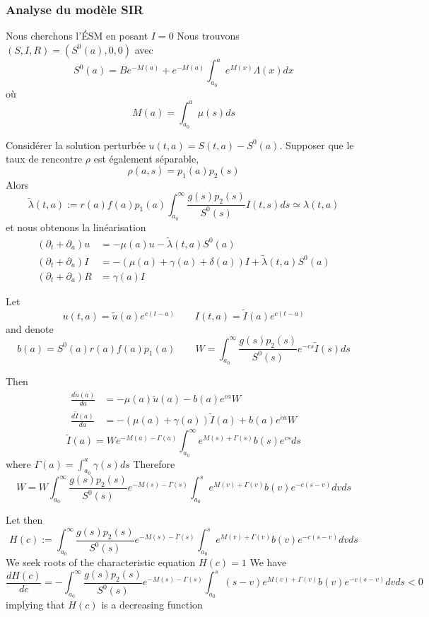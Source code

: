 \documentclass[aspectratio=169]{beamer}\usepackage[]{graphicx}\usepackage[]{xcolor}
\begin{document}
\begin{frame}\frametitle{Analyse du modèle SIR}
Nous cherchons l'ÉSM en posant $I=0$
\vfill
Nous trouvons $(S,I,R)=(S^0(a),0,0)$ avec
\[
S^0(a)=Be^{-M(a)} +e^{-M(a)}\int_{a_0}^a e^{M(x)}\Lambda(x)dx
\]
où
\[
M(a)=\int_{a_0}^a \mu(s)ds
\]
\end{frame}


\begin{frame}
Considérer la solution perturbée $u(t,a)=S(t,a)-S^0(a)$. Supposer que le taux de rencontre $\rho$ est également séparable,
\[
\rho(a,s)=p_1(a)p_2(s)
\]
Alors
\[
\tilde\lambda(t,a):=r(a)f(a)p_1(a)\int_{a_0}^\infty
\frac{g(s)p_2(s)}{S^0(s)}I(t,s) ds \simeq \lambda(t,a)
\]
et nous obtenons la linéarisation
\begin{align*}
(\partial_t+\partial_a)u&=-\mu(a)u-\tilde\lambda(t,a)S^0(a) \\
(\partial_t+\partial_a)I&=-(\mu(a)+\gamma(a)+\delta(a))I
+\tilde\lambda(t,a)S^0(a) \\
(\partial_t+\partial_a)R&=\gamma(a)I
\end{align*}
\end{frame}


\begin{frame}
Let
\[
u(t,a)=\tilde u(a)e^{c(t-a)}\quad\quad I(t,a)=\tilde I(a)e^{c(t-a)}
\]
and denote
\[
b(a)=S^0(a)r(a)f(a)p_1(a)\quad\quad W=\int_{a_0}^\infty
\frac{g(s)p_2(s)}{S^0(s)}e^{-cs}\tilde I(s)ds
\]
\end{frame}


\begin{frame}
Then
\begin{align*}
\frac{d\tilde u(a)}{da} &= -\mu(a)\tilde u(a)-b(a)e^{ca}W \\
\frac{d\tilde I(a)}{da} &= -(\mu(a)+\gamma(a))\tilde I(a)+b(a)e^{ca}W
\end{align*}
\[
\tilde I(a)=We^{-M(a)-\Gamma(a)}\int_{a_0}^\infty
e^{M(s)+\Gamma(s)}b(s)e^{cs}ds
\]
where $\Gamma(a)=\int_{a_0}^a\gamma(s)ds$
\vfill
Therefore
\[
W=W\int_{a_0}^\infty \frac{g(s)p_2(s)}{S^0(s)}e^{-M(s)-\Gamma(s)}
\int_{a_0}^s e^{M(v)+\Gamma(v)}b(v)e^{-c(s-v)}dvds
\]
\end{frame}

\begin{frame}
Let then
\[
H(c):=\int_{a_0}^\infty \frac{g(s)p_2(s)}{S^0(s)}e^{-M(s)-\Gamma(s)}
\int_{a_0}^s e^{M(v)+\Gamma(v)}b(v)e^{-c(s-v)}dvds
\]
\vfill
We seek roots of the characteristic equation $H(c)=1$
\vfill
We have
{\footnotesize
\[
\frac{dH(c)}{dc}=-\int_{a_0}^\infty
\frac{g(s)p_2(s)}{S^0(s)}e^{-M(s)-\Gamma(s)}
\int_{a_0}^s (s-v)e^{M(v)+\Gamma(v)}b(v)e^{-c(s-v)}dvds<0
\]}
implying that $H(c)$ is a decreasing function
\end{frame}
\end{document}
